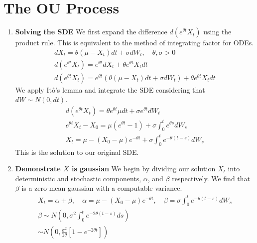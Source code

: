 \documentclass{article}
\begin{document}
\section{The OU Process}
    \begin{enumerate}
        \item \textbf{Solving the SDE}
            We first expand the difference $d(e^{\theta t}X_t)$ using the
            product rule. This is equivalent to the method of integrating factor
            for ODEs. 
            \begin{gather*}
                dX_t = \theta(\mu-X_t)dt + \sigma dW_t, \quad \theta, \sigma > 0
                \\
                d(e^{\theta t}X_t) = e^{\theta t}dX_t + \theta e^{\theta t}X_tdt
                \\
                d(e^{\theta t}X_t) =  e^{\theta t}\left(\theta(\mu-X_t)dt +
                \sigma dW_t\right) + \theta e^{\theta t}X_t dt
            \end{gather*}
            We apply It\^{o}'s lemma and integrate the SDE considering that $dW
            \sim N(0, dt)$. 
            \begin{gather*}
                d(e^{\theta t}X_t) = \theta e^{\theta t}\mu dt +
                \sigma e^{\theta t} dW_t
                \\
                e^{\theta t}X_t - X_0 = \mu (e^{\theta t} - 1) + \sigma \int_0^t e^{\theta s}dW_s
                \\
                X_t = \mu - (X_0 - \mu)e^{-\theta t} + \sigma \int_0^t e^{-\theta
                (t - s)}dW_s
            \end{gather*}
            This is the solution to our original SDE. 
        \item \textbf{Demonstrate $X$ is gaussian}
            We begin by dividing our solution $X_t$ into deterministic and
            stochastic components, $\alpha$, and $\beta$ respectively. We find
            that $\beta$ is a zero-mean gaussian with a computable variance. 
            \begin{gather*}
                X_t = \alpha + \beta, \quad \alpha = \mu - (X_0 - \mu)e^{-\theta
                t}, \quad \beta = \sigma \int_0^t e^{-\theta (t - s)}dW_s
                \\
                \beta \sim N(0,
                \sigma^2\int_0^t e^{-2\theta (t - s)}ds)
                \\
                \sim N\left(0, \frac{\sigma^2}{2\theta}\left[1 -  e^{-2\theta t}\right]\right)

\end{gather*}
\end{enumerate}
\end{document}
